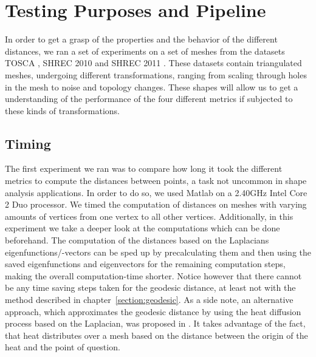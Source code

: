 \chapter{Testing Purposes and Pipeline}
\label{chapter:testing}


In order to get a grasp of the properties and the behavior of the different distances, we ran a set of experiments on a set of meshes from the datasets TOSCA \cite{bronstein2008numerical}, SHREC 2010 \cite{bronstein2010shrec} and SHREC 2011 \cite{dutagaci2011shrec}.
These datasets contain triangulated meshes, undergoing different transformations, ranging from scaling through holes in the mesh to noise and topology changes.
These shapes will allow us to get a understanding of the performance of the four different metrics if subjected to these kinds of transformations.

\section{Timing}

The first experiment we ran was to compare how long it took the different metrics to compute the distances between points, a task not uncommon in shape analysis applications.
In order to do so, we used Matlab on a 2.40GHz Intel Core 2 Duo processor.
We timed the computation of distances on meshes with varying amounts of vertices from one vertex to all other vertices.
Additionally, in this experiment we take a deeper look at the computations which can be done beforehand.
The computation of the distances based on the Laplacians eigenfunctions/-vectors can be sped up by precalculating them and then using the saved eigenfunctions and eigenvectors for the remaining computation steps, making the overall computation-time shorter.
Notice however that there cannot be any time saving steps taken for the geodesic distance, at least not with the method described in chapter~\ref{section:geodesic}.
As a side note, an alternative approach, which approximates the geodesic distance by using the heat diffusion process based on the Laplacian, was proposed in \cite{crane2013geodesics}.
It takes advantage of the fact, that heat distributes over a mesh based on the distance between the origin of the heat and the point of question.

